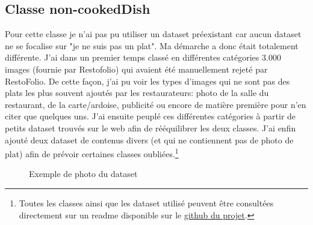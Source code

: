 \documentclass[a4paper,12pt]{report}
\begin{document}
      \subsection{Classe non-cookedDish}
      Pour cette classe je n'ai pas pu utiliser un dataset préexistant car aucun dataset ne se focalise sur "je ne suis pas un plat". Ma démarche a donc était totalement différente.
      \medbreak
      J'ai dans un premier temps classé en différentes catégories 3.000 images (fournie par Restofolio) qui avaient été manuellement rejeté par RestoFolio. De cette façon, j'ai pu voir les types d'images qui ne sont pas des plats les plus souvent ajoutés par les restaurateurs: photo de la salle du restaurant, de la carte/ardoise, publicité ou encore de matière première pour n'en citer que quelques uns.
      \medbreak
      J'ai ensuite peuplé ces différentes catégories à partir de petits dataset trouvés sur le web afin de rééquilibrer les deux classes. J'ai enfin ajouté deux dataset de contenus divers (et qui ne contiennent pas de photo de plat) afin de prévoir certaines classes oubliées.\footnote{Toutes les classes ainsi que les dataset utilisé peuvent être consultées directement sur un readme disponible sur le \href{https://github.com/plabadille/cookedDishRecognizer/blob/master/data-set/dataset_notCookedDish.txt}{github du projet}.}
      \medbreak
      \begin{figure}[!h]%
        \centering
        \qquad
        \qquad
        \caption{Exemple de photo du dataset}%
      \end{figure}%
\end{document}
